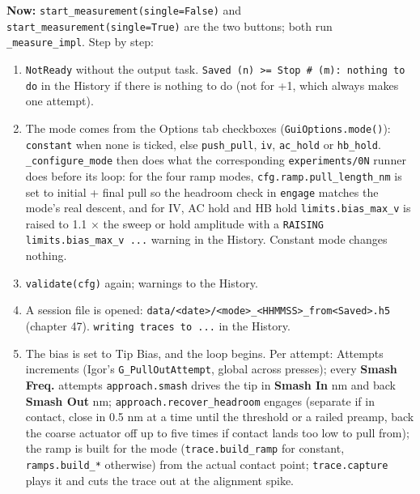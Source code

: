 \textbf{Now:} \texttt{start\_\discretionary{}{}{}measurement(single=False)} and \texttt{start\_\discretionary{}{}{}measurement(single=True)} are the two buttons; both run \texttt{\_\discretionary{}{}{}measure\_\discretionary{}{}{}impl}. Step by step:

\begin{enumerate}[leftmargin=*]
\item \texttt{Not\discretionary{}{}{}Ready} without the output task. \texttt{Saved (n) >= Stop \# (m): nothing to do} in the History if there is nothing to do (not for +1, which always makes one attempt).
\item The mode comes from the Options tab checkboxes (\texttt{Gui\discretionary{}{}{}Options.\discretionary{}{}{}mode()}): \texttt{constant} when none is ticked, else \texttt{push\_\discretionary{}{}{}pull}, \texttt{iv}, \texttt{ac\_\discretionary{}{}{}hold} or \texttt{hb\_\discretionary{}{}{}hold}. \texttt{\_\discretionary{}{}{}configure\_\discretionary{}{}{}mode} then does what the corresponding \texttt{experiments/\discretionary{}{}{}0N} runner does before its loop: for the four ramp modes, \texttt{cfg.\discretionary{}{}{}ramp.\discretionary{}{}{}pull\_\discretionary{}{}{}length\_\discretionary{}{}{}nm} is set to initial + final pull so the headroom check in \texttt{engage} matches the mode's real descent, and for IV, AC hold and HB hold \texttt{limits.\discretionary{}{}{}bias\_\discretionary{}{}{}max\_\discretionary{}{}{}v} is raised to 1.1 $\times$ the sweep or hold amplitude with a \texttt{RAISING limits.\discretionary{}{}{}bias\_\discretionary{}{}{}max\_\discretionary{}{}{}v .\discretionary{}{}{}.\discretionary{}{}{}.\discretionary{}{}{}} warning in the History. Constant mode changes nothing.
\item \texttt{validate(cfg)} again; warnings to the History.
\item A session file is opened: \texttt{data/\discretionary{}{}{}<date>/\discretionary{}{}{}<mode>\_\discretionary{}{}{}<HHMMSS>\_\discretionary{}{}{}from<Saved>.\discretionary{}{}{}h5} (chapter 47). \texttt{writing traces to .\discretionary{}{}{}.\discretionary{}{}{}.\discretionary{}{}{}} in the History.
\item The bias is set to Tip Bias, and the loop begins. Per attempt: Attempts increments (Igor's \texttt{G\_\discretionary{}{}{}Pull\discretionary{}{}{}Out\discretionary{}{}{}Attempt}, global across presses); every \textbf{Smash Freq.} attempts \texttt{approach.\discretionary{}{}{}smash} drives the tip in \textbf{Smash In} nm and back \textbf{Smash Out} nm; \texttt{approach.\discretionary{}{}{}recover\_\discretionary{}{}{}headroom} engages (separate if in contact, close in 0.5 nm at a time until the threshold or a railed preamp, back the coarse actuator off up to five times if contact lands too low to pull from); the ramp is built for the mode (\texttt{trace.\discretionary{}{}{}build\_\discretionary{}{}{}ramp} for constant, \texttt{ramps.\discretionary{}{}{}build\_\discretionary{}{}{}*} otherwise) from the actual contact point; \texttt{trace.\discretionary{}{}{}capture} plays it and cuts the trace out at the alignment spike.

\end{enumerate}
